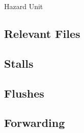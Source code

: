 \label{sec:h}
Hazard Unit

\subsection{Relevant Files}

\subsection{Stalls}

\subsection{Flushes}

\subsection{Forwarding}\label{sec:fwd}